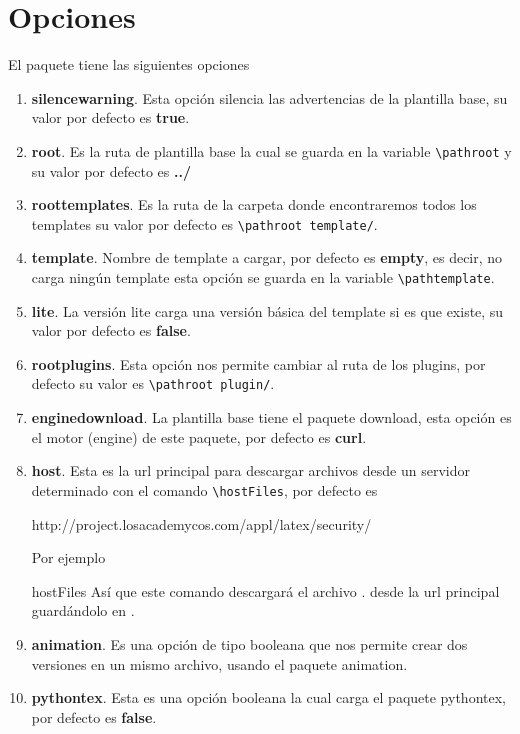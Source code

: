 {	\section{Opciones}
	El paquete \printproject\space tiene las siguientes opciones
	\begin{enumerate}
		\item \textbf{silencewarning}. Esta opción silencia las advertencias de la plantilla base, su valor por defecto es \textbf{true}.
		\item \textbf{root}. Es la ruta de plantilla base la cual se guarda en la variable \verb|\pathroot| y su valor por defecto es \textbf{../}
		\item \textbf{roottemplates}. Es la ruta de la carpeta donde encontraremos todos los templates su valor por defecto es \verb|\pathroot template/|.
		\item \textbf{template}. Nombre de template a cargar, por defecto es \textbf{empty}, es decir, no carga ningún template  esta opción se guarda en la variable \verb|\pathtemplate|.
		\item \textbf{lite}. La versión lite carga una versión básica del template si es que existe, su valor por defecto es \textbf{false}.
		\item \textbf{rootplugins}. Esta opción nos permite cambiar al ruta de los plugins, por defecto su valor es \verb|\pathroot plugin/|.
		\item \textbf{enginedownload}. La plantilla base tiene el paquete download, esta opción es el motor (engine) de este paquete, por defecto es \textbf{curl}.
		\item \textbf{host}. Esta es la url principal para descargar archivos desde un servidor determinado con el comando \verb|\hostFiles|, por defecto es
		\begin{center}
			http://project.losacademycos.com/appl/latex/security/
		\end{center}
		Por ejemplo 
		\begin{docCommand}{hostFiles}{}
			Así que este comando descargará el archivo . desde la url principal guardándolo en .
		\end{docCommand}
		\item \textbf{animation}. Es una opción de tipo booleana que nos permite crear dos versiones en un mismo archivo, usando el paquete animation.
		\item \textbf{pythontex}. Esta es una opción booleana la cual carga el paquete pythontex, por defecto es \textbf{false}.

\end{enumerate}}
